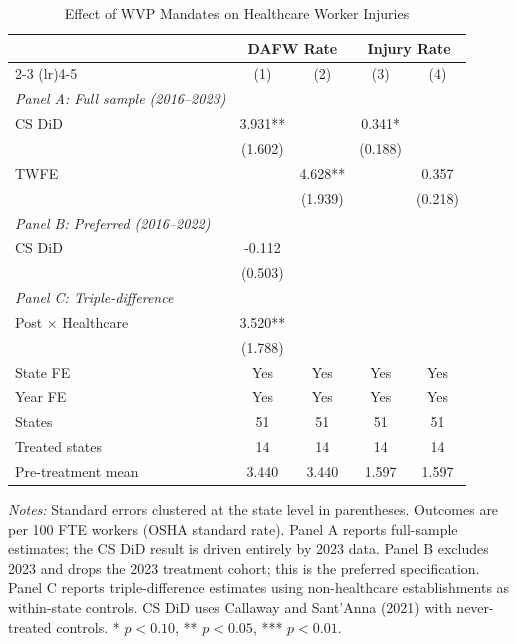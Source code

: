 \begin{table}[htbp]
\centering
\caption{Effect of WVP Mandates on Healthcare Worker Injuries}
\label{tab:main}
\begin{tabular}{lcccc}
\toprule
 & \multicolumn{2}{c}{DAFW Rate} & \multicolumn{2}{c}{Injury Rate} \\
\cmidrule(lr){2-3} \cmidrule(lr){4-5}
 & (1) & (2) & (3) & (4) \\
\midrule
\textit{Panel A: Full sample (2016--2023)} & & & & \\
CS DiD & 3.931** & & 0.341* & \\
 & (1.602) & & (0.188) & \\
\addlinespace
TWFE & & 4.628** & & 0.357 \\
 & & (1.939) & & (0.218) \\
\addlinespace
\textit{Panel B: Preferred (2016--2022)} & & & & \\
CS DiD & -0.112 & & & \\
 & (0.503) & & & \\
\addlinespace
\textit{Panel C: Triple-difference} & & & & \\
Post $\times$ Healthcare & 3.520** & & & \\
 & (1.788) & & & \\
\midrule
State FE & Yes & Yes & Yes & Yes \\
Year FE & Yes & Yes & Yes & Yes \\
States & 51 & 51 & 51 & 51 \\
Treated states & 14 & 14 & 14 & 14 \\
Pre-treatment mean & 3.440 & 3.440 & 1.597 & 1.597 \\
\bottomrule
\end{tabular}
\begin{tablenotes}[flushleft]
\small
\item \textit{Notes:} Standard errors clustered at the state level in parentheses. Outcomes are per 100 FTE workers (OSHA standard rate). Panel A reports full-sample estimates; the CS DiD result is driven entirely by 2023 data. Panel B excludes 2023 and drops the 2023 treatment cohort; this is the preferred specification. Panel C reports triple-difference estimates using non-healthcare establishments as within-state controls. CS DiD uses Callaway and Sant'Anna (2021) with never-treated controls. * $p<0.10$, ** $p<0.05$, *** $p<0.01$.
\end{tablenotes}
\end{table}

